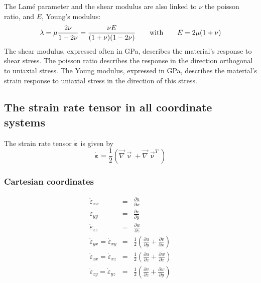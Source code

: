 
The Lam\'e parameter and the shear modulus are also linked to $\nu$ the poisson ratio, 
and $E$, Young's modulus:  
\[
\lambda=\mu\frac{2\nu}{1-2\nu}
=\frac{\nu E}{(1+\nu)(1-2\nu)}
\quad\quad
{\rm with}
\quad\quad
E=2\mu(1+\nu)
\]
The shear modulus, expressed often in GPa, describes the material's response to shear stress.
The poisson ratio describes the response in the direction orthogonal to uniaxial stress.
The Young modulus, expressed in GPa, describes the material's strain response to uniaxial stress in the 
direction of this stress.


\newpage
\subsection{The strain rate tensor in all coordinate systems}

The strain rate tensor $\dot{\bm\varepsilon}$ is given by
\begin{equation}
\dot{\bm \varepsilon} = \frac{1}{2}( {\vec \nabla}{\vec \upnu}+ {\vec \nabla}{\vec \upnu}^T) 
\end{equation}

\subsubsection{Cartesian coordinates}
\begin{eqnarray}
\dot\varepsilon_{xx} &=& \frac{\partial u}{\partial x} \\
\dot\varepsilon_{yy} &=& \frac{\partial v}{\partial y} \\
\dot\varepsilon_{zz} &=& \frac{\partial w}{\partial z} \\
\dot\varepsilon_{yx} =
\dot\varepsilon_{xy} &=& \frac{1}{2} \left( \frac{\partial u}{\partial y} + \frac{\partial v}{\partial x}  \right)\\
\dot\varepsilon_{zx} =
\dot\varepsilon_{xz} &=& \frac{1}{2} \left( \frac{\partial u}{\partial z} + \frac{\partial w}{\partial x}  \right)\\
\dot\varepsilon_{zy} =
\dot\varepsilon_{yz} &=& \frac{1}{2} \left( \frac{\partial v}{\partial z} + \frac{\partial w}{\partial y}  \right)
\end{eqnarray}

